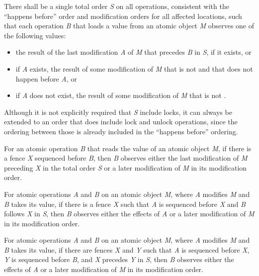 \pnum
There shall be a single total order \textit{S} on all 
operations, consistent with the ``happens before'' order and modification orders for all
affected locations, such that each  operation
\textit{B} that loads a
value from an atomic object \textit{M}
observes one of the following values:

\begin{itemize}
\item the result of the last modification \textit{A} of \textit{M} that precedes
\textit{B} in \textit{S}, if it exists, or

\item if \textit{A} exists, the result of some modification of \textit{M}
that is not
 and that does not happen before \textit{A}, or

\item if \textit{A} does not exist, the result of some modification of \textit{M}
that is not
.
\end{itemize}

\begin{note} Although it is not explicitly required that \textit{S} include locks, it can
always be extended to an order that does include lock and unlock operations, since the
ordering between those is already included in the ``happens before'' ordering. \end{note}

\pnum
For an atomic operation \textit{B} that reads the value of an atomic object \textit{M},
if there is a  fence \textit{X} sequenced before \textit{B},
then \textit{B} observes either the last  modification of
\textit{M} preceding \textit{X} in the total order \textit{S} or a later modification of
\textit{M} in its modification order.

\pnum
For atomic operations \textit{A} and \textit{B} on an atomic object \textit{M}, where
\textit{A} modifies \textit{M} and \textit{B} takes its value, if there is a
 fence \textit{X} such that \textit{A} is sequenced before
\textit{X} and \textit{B} follows \textit{X} in \textit{S}, then \textit{B} observes
either the effects of \textit{A} or a later modification of \textit{M} in its
modification order.

\pnum
For atomic operations \textit{A} and \textit{B} on an atomic object \textit{M}, where
\textit{A} modifies \textit{M} and \textit{B} takes its value, if there are
 fences \textit{X} and \textit{Y} such that \textit{A} is
sequenced before \textit{X}, \textit{Y} is sequenced before \textit{B}, and \textit{X}
precedes \textit{Y} in \textit{S}, then \textit{B} observes either the effects of
\textit{A} or a later modification of \textit{M} in its modification order.

